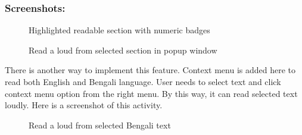 \subsubsection*{Screenshots:}

\begin{figure}[htbp] 
    \centering
    \caption{Highlighted readable section with numeric badges}
    \label{fig:highlighted_readable_section}
\end{figure}

\begin{figure}[H] 
    \centering
    \caption{Read a loud from selected section in popup window}
    \label{fig:read_loud_selected_section}
\end{figure}

There is another way to implement this feature. Context menu is added here to read both English and Bengali language. User needs to select text and click context menu option from the right menu. By this way, it can read selected text loudly. Here is a screenshot of this activity.

\begin{figure}[H] 
    \centering
    \caption{Read a loud from selected Bengali text}
    \label{fig:read_loud_selected_section}
\end{figure}

